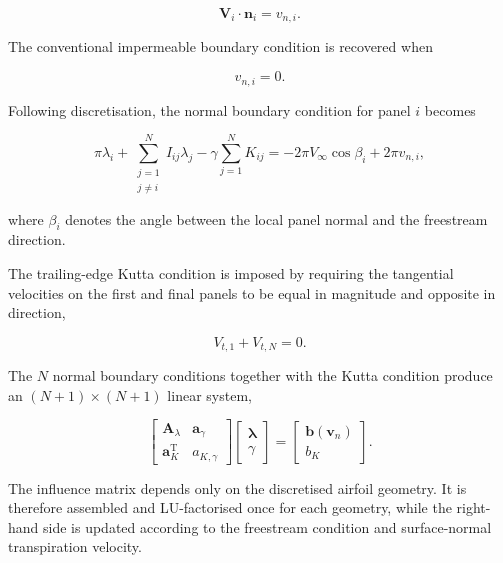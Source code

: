 \documentclass[a4paper,fleqn]{cas-dc}
\begin{document}
\begin{equation}
	\boldsymbol{V}_i
	\cdot
	\boldsymbol{n}_i
	=
	v_{n,i}.
	\label{eq:porous_normal_bc}
\end{equation}

The conventional impermeable boundary condition is recovered when

\begin{equation}
	v_{n,i}=0.
\end{equation}

Following discretisation, the normal boundary condition for panel $i$
becomes

\begin{equation}
	\pi\lambda_i
	+
	\sum_{\substack{j=1\\j\neq i}}^{N}
	I_{ij}\lambda_j
	-
	\gamma
	\sum_{j=1}^{N}K_{ij}
	=
	-2\pi V_{\infty}\cos\beta_i
	+
	2\pi v_{n,i},
	\label{eq:normal_panel_equation}
\end{equation}

where $\beta_i$ denotes the angle between the local panel normal and
the freestream direction.

The trailing-edge Kutta condition is imposed by requiring the
tangential velocities on the first and final panels to be equal in
magnitude and opposite in direction,

\begin{equation}
	V_{t,1}
	+
	V_{t,N}
	=
	0.
	\label{eq:kutta}
\end{equation}

The $N$ normal boundary conditions together with the Kutta condition
produce an $(N+1)\times(N+1)$ linear system,

\begin{equation}
	\begin{bmatrix}
		\boldsymbol{A}_{\lambda}
		&
		\boldsymbol{a}_{\gamma}
		\\
		\boldsymbol{a}_{K}^{\mathrm T}
		&
		a_{K,\gamma}
	\end{bmatrix}
	\begin{bmatrix}
		\boldsymbol{\lambda}\\
		\gamma
	\end{bmatrix}
	=
	\begin{bmatrix}
		\boldsymbol{b}(\boldsymbol v_n)\\
		b_K
	\end{bmatrix}.
	\label{eq:panel_matrix}
\end{equation}

The influence matrix depends only on the discretised airfoil geometry.
It is therefore assembled and LU-factorised once for each geometry,
while the right-hand side is updated according to the freestream
condition and surface-normal transpiration velocity.
\end{document}
